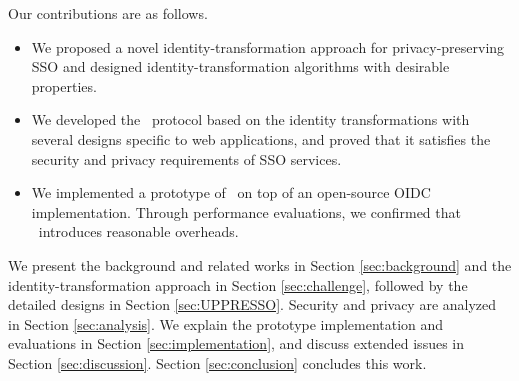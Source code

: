 Our contributions are as follows.
\vspace{-\topsep}
\begin{itemize}
\setlength{\topsep}{0pt}
\setlength{\partopsep}{0pt}
\setlength{\itemsep}{0pt}
\setlength{\parsep}{0pt}
\setlength{\parskip}{0pt}
\item We proposed a novel identity-transformation approach for privacy-preserving SSO and designed identity-transformation algorithms with desirable properties.
\item We developed the \usso\ protocol based on the identity transformations with several designs specific to web applications, and proved that it satisfies the security and privacy requirements of SSO services.
\item We implemented a prototype of \usso\ on top of an open-source OIDC implementation. Through performance evaluations, we confirmed that \usso\ introduces reasonable overheads.
\end{itemize}


We present the background and related works in Section \ref{sec:background} and the identity-transformation approach in Section \ref{sec:challenge}, followed by the detailed designs in Section \ref{sec:UPPRESSO}.
Security and privacy are analyzed in Section \ref{sec:analysis}.
We explain the prototype implementation and evaluations in Section \ref{sec:implementation}, and discuss extended issues in Section \ref{sec:discussion}. Section \ref{sec:conclusion} concludes this work.
